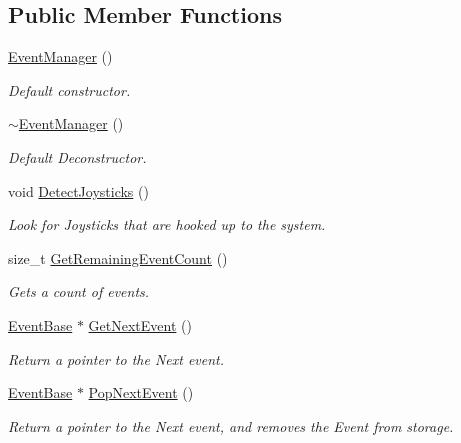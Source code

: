 \subsection*{Public Member Functions}
\begin{DoxyCompactItemize}
\item 
\hyperlink{classphys_1_1EventManager_a018b36588bf2a2e90536e64be060d6fc}{EventManager} ()
\begin{DoxyCompactList}\small\item\em Default constructor. \item\end{DoxyCompactList}\item 
\hyperlink{classphys_1_1EventManager_aa6df8df9b7a11dadcd9bc79ecdf54558}{$\sim$EventManager} ()
\begin{DoxyCompactList}\small\item\em Default Deconstructor. \item\end{DoxyCompactList}\item 
void \hyperlink{classphys_1_1EventManager_a0b36c605c2a059c96e787ed4c1fd68bc}{DetectJoysticks} ()
\begin{DoxyCompactList}\small\item\em Look for Joysticks that are hooked up to the system. \item\end{DoxyCompactList}\item 
size\_\-t \hyperlink{classphys_1_1EventManager_af3e02562344e4de9c40d91446acd84dc}{GetRemainingEventCount} ()
\begin{DoxyCompactList}\small\item\em Gets a count of events. \item\end{DoxyCompactList}\item 
\hyperlink{classphys_1_1EventBase}{EventBase} $\ast$ \hyperlink{classphys_1_1EventManager_aa0937763961aefc59aea197a8f9bc0dc}{GetNextEvent} ()
\begin{DoxyCompactList}\small\item\em Return a pointer to the Next event. \item\end{DoxyCompactList}\item 
\hyperlink{classphys_1_1EventBase}{EventBase} $\ast$ \hyperlink{classphys_1_1EventManager_ae403b203bc425744377ec5fc311f4e5d}{PopNextEvent} ()
\begin{DoxyCompactList}\small\item\em Return a pointer to the Next event, and removes the Event from storage. \item\end{DoxyCompactList}\item 

\end{DoxyCompactItemize}
